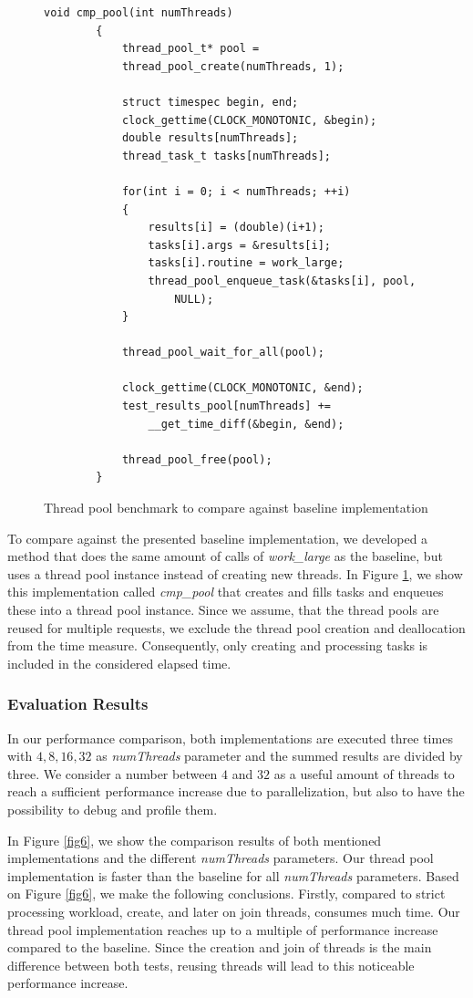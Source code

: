 \documentclass[conference]{IEEEtran}
\begin{document}
\begin{figure}
	\begin{lstlisting}[style=CStyle,numbers=none]
		void cmp_pool(int numThreads)
		{
			thread_pool_t* pool = 
			thread_pool_create(numThreads, 1);
			
			struct timespec begin, end;
			clock_gettime(CLOCK_MONOTONIC, &begin);
			double results[numThreads];
			thread_task_t tasks[numThreads];
			
			for(int i = 0; i < numThreads; ++i)
			{
				results[i] = (double)(i+1);
				tasks[i].args = &results[i];
				tasks[i].routine = work_large;
				thread_pool_enqueue_task(&tasks[i], pool, 
					NULL);
			}
			
			thread_pool_wait_for_all(pool);
			
			clock_gettime(CLOCK_MONOTONIC, &end);
			test_results_pool[numThreads] += 
				__get_time_diff(&begin, &end);
			
			thread_pool_free(pool);
		}
	\end{lstlisting}
	\caption{Thread pool benchmark to compare against baseline implementation}
	\label{fig5}
\end{figure}

To compare against the presented baseline implementation, we developed a method that does the same amount of calls of \emph{work\_large} as the baseline, but uses a thread pool instance instead of creating new threads. In Figure \ref{fig5}, we show this implementation called \emph{cmp\_pool} that creates and fills tasks and enqueues these into a thread pool instance. Since we assume, that the thread pools are reused for multiple requests, we exclude the thread pool creation and deallocation from the time measure. Consequently, only creating and processing tasks is included in the considered elapsed time. 


\subsubsection{Evaluation Results}
In our performance comparison, both implementations are executed three times with $4, 8, 16, 32$ as \emph{numThreads} parameter and the summed results are divided by three. We consider a number between $4$ and $32$ as a useful amount of threads to reach a sufficient performance increase due to parallelization, but also to have the possibility to debug and profile them. 

In Figure \ref{fig6}, we show the comparison results of both mentioned implementations and the different \emph{numThreads} parameters. Our thread pool implementation is faster than the baseline for all \emph{numThreads} parameters. Based on Figure \ref{fig6}, we make the following conclusions.  
Firstly, compared to strict processing workload, create, and later on join threads, consumes much time. Our thread pool implementation reaches up to a multiple of performance increase compared to the baseline. Since the creation and join of threads is the main difference between both tests, reusing threads will lead to this noticeable performance increase. 
\end{document}
